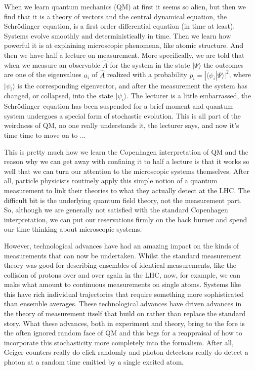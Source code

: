 \documentclass[12pt]{article}
\theoremstyle{plain}
\theoremstyle{definition}
\theoremstyle{remark}
\def\SCH{Schr\"odinger\ }
\def\bra#1{\langle #1|}
\def\ket#1{| #1\rangle}
\begin{document}
When we learn quantum mechanics (QM) at first it seems so alien, but then we find that it is a theory of vectors and the central dynamical equation, the \SCH equation, is a first order differential equation (in time at least). Systems evolve smoothly and deterministically in time. Then we learn how powerful it is at explaining microscopic phenomena, like atomic structure. And then we have half a lecture on measurement. More specifically, we are told that when we measure an observable $\hat A$ for the system in the state $\ket{\Psi}$ the outcomes are one of the eigenvalues $a_i$ of $\hat A$ realized with a probability $p_i=|\bra{\psi_i}\Psi\rangle|^2$, where $\ket{\psi_i}$ is the corresponding eigenvector, and after the measurement the system has changed, or collapsed, into the state $\ket{\psi_i}$. The lecturer is a little embarrassed, the \SCH equation has been suspended for a brief moment and quantum system undergoes a special form of stochastic evolution. This is all part of the weirdness of QM, no one really understands it, the lecturer says, and now it's time time to move on to ...

This is pretty much how we learn the Copenhagen interpretation of QM and the reason why we can get away with confining it to half a lecture is that it works so well that we can turn our attention to the microscopic systems themselves. After all, particle physicists routinely apply this simple notion of a quantum measurement to link their theories to what they actually detect at the LHC. The difficult bit is the underlying quantum field theory, not the measurement part. So, although we are generally not satisfied with the standard Copenhagen interpretation, we can put our reservations firmly on the back burner and spend our time thinking about microscopic systems. %

However, technological advances have had an amazing impact on the kinds of measurements that can now be undertaken. Whilst the standard measurement theory was good for describing ensembles of identical measurements, like 
the collision of protons over and over again in the LHC, now, for example, we can make what amount to continuous measurements on single atoms. Systems like this have rich individual trajectories that require something more sophisticated than ensemble averages. These technological advances have driven advances in the theory of measurement itself that build on rather than replace the standard story. What these advances, both in experiment and theory, bring to the fore is the often ignored random face of QM and this begs for a reappraisal of how to incorporate this stochasticity more completely into the formalism.
After all, Geiger counters really do click randomly and photon detectors really do detect a photon at a random time emitted by a single excited atom.
\end{document}
